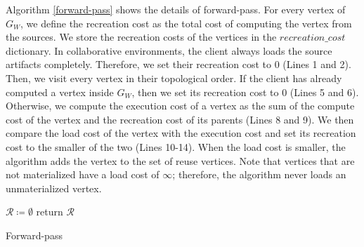Algorithm \ref{forward-pass} shows the details of forward-pass.
For every vertex of $G_W$, we define the recreation cost as the total cost of computing the vertex from the sources.
We store the recreation costs of the vertices in the $recreation\_cost$ dictionary.
In collaborative environments, the client always loads the source artifacts completely.
Therefore, we set their recreation cost to 0 (Lines 1 and 2).
Then, we visit every vertex in their topological order.
If the client has already computed a vertex inside $G_W$, then we set its recreation cost to 0 (Lines 5 and 6).
Otherwise, we compute the execution cost of a vertex as the sum of the compute cost of the vertex and the recreation cost of its parents (Lines 8 and 9).
We then compare the load cost of the vertex with the execution cost and set its recreation cost to the smaller of the two (Lines 10-14).
When the load cost is smaller, the algorithm adds the vertex to the set of reuse vertices.
Note that vertices that are not materialized have a load cost of $\infty$; therefore, the algorithm never loads an unmaterialized vertex.
\begin{algorithm}[h]
$\mathcal{R} \coloneqq \emptyset$\;
return $\mathcal{R}$\;
\caption{Forward-pass}\label{forward-pass}
\end{algorithm}

